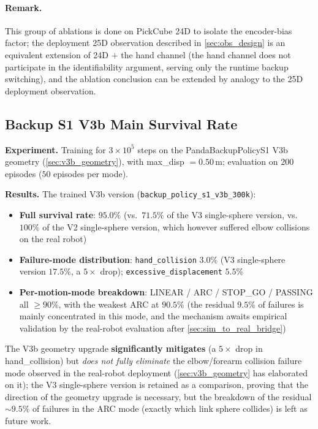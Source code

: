 \paragraph{Remark.} This group of ablations is done on PickCube 24D to isolate the encoder-bias factor; the deployment 25D observation described in \cref{sec:obs_design} is an equivalent extension of 24D $+$ the hand channel (the hand channel does not participate in the identifiability argument, serving only the runtime backup switching), and the ablation conclusion can be extended by analogy to the 25D deployment observation.

\subsection{Backup S1 V3b Main Survival Rate}\label{sec:exp_backup_s1}

\textbf{Experiment.} Training for $3 \times 10^5$ steps on the PandaBackupPolicyS1 V3b geometry (\cref{sec:v3b_geometry}), with max\_disp $= 0.50$\,m; evaluation on $200$ episodes ($50$ episodes per mode).

\textbf{Results.} The trained V3b version (\texttt{backup\_policy\_s1\_v3b\_300k}):
\begin{itemize}
  \item \textbf{Full survival rate}: $95.0\%$ (vs.\ $71.5\%$ of the V3 single-sphere version, vs.\ $100\%$ of the V2 single-sphere version, which however suffered elbow collisions on the real robot)
  \item \textbf{Failure-mode distribution}: \texttt{hand\_collision} $3.0\%$ (V3 single-sphere version $17.5\%$, a $5\times$ drop); \texttt{excessive\_displacement} $5.5\%$
  \item \textbf{Per-motion-mode breakdown}: LINEAR / ARC / STOP\_GO / PASSING all $\geq 90\%$, with the weakest ARC at $90.5\%$ (the residual $9.5\%$ of failures is mainly concentrated in this mode, and the mechanism awaits empirical validation by the real-robot evaluation after \cref{sec:sim_to_real_bridge})
\end{itemize}

The V3b geometry upgrade \textbf{significantly mitigates} (a $5\times$ drop in hand\_collision) but \emph{does not fully eliminate} the elbow/forearm collision failure mode observed in the real-robot deployment (\cref{sec:v3b_geometry} has elaborated on it); the V3 single-sphere version is retained as a comparison, proving that the direction of the geometry upgrade is necessary, but the breakdown of the residual $\sim 9.5\%$ of failures in the ARC mode (exactly which link sphere collides) is left as future work.

